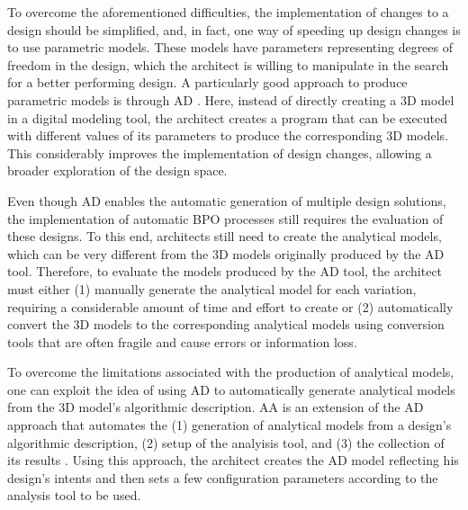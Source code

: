 	To overcome the aforementioned difficulties, the implementation of changes to a design should be simplified, and, in fact, one way of speeding up design changes is to use parametric models. These models have parameters representing degrees of freedom in the design, which the architect is willing to manipulate in the search for a better performing design. A particularly good approach to produce parametric models is through \ac{AD} \cite{Terzidis2006}. Here, instead of directly creating a 3D model in a digital modeling tool, the architect creates a program that can be executed with different values of its parameters to produce the corresponding 3D models. This considerably improves the implementation of design changes, allowing a broader exploration of the design space.
	
	Even though \ac{AD} enables the automatic generation of multiple design solutions, the implementation of automatic \ac{BPO} processes still requires the evaluation of these designs. To this end, architects still need to create  the analytical models, which can be very different from the 3D models originally produced by the \ac{AD} tool. Therefore, to evaluate the models produced by the \ac{AD} tool, the architect must either (1) manually generate the analytical model for each variation, requiring a considerable amount of time and effort to create or (2) automatically convert the 3D models to the corresponding analytical models using conversion tools that are often fragile and cause errors or information loss. 
	
	To overcome the limitations associated with the production of analytical models, one can exploit the idea of using \ac{AD} to automatically generate analytical models from the 3D model's algorithmic description. \ac{AA} is an extension of the \ac{AD} approach that automates the (1) generation of analytical models from a design's algorithmic description, (2) setup of the analyisis tool, and (3) the collection of its results \cite{Aguiar2017}. Using this approach, the architect creates the \ac{AD} model reflecting his design's intents and then sets a few configuration parameters according to the analysis tool to be used. %
	
